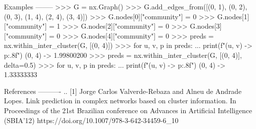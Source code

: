 \begin{DoxyVerb}
Examples
--------
>>> G = nx.Graph()
>>> G.add_edges_from([(0, 1), (0, 2), (0, 3), (1, 4), (2, 4), (3, 4)])
>>> G.nodes[0]["community"] = 0
>>> G.nodes[1]["community"] = 1
>>> G.nodes[2]["community"] = 0
>>> G.nodes[3]["community"] = 0
>>> G.nodes[4]["community"] = 0
>>> preds = nx.within_inter_cluster(G, [(0, 4)])
>>> for u, v, p in preds:
...     print(f"({u}, {v}) -> {p:.8f}")
(0, 4) -> 1.99800200
>>> preds = nx.within_inter_cluster(G, [(0, 4)], delta=0.5)
>>> for u, v, p in preds:
...     print(f"({u}, {v}) -> {p:.8f}")
(0, 4) -> 1.33333333

References
----------
.. [1] Jorge Carlos Valverde-Rebaza and Alneu de Andrade Lopes.
   Link prediction in complex networks based on cluster information.
   In Proceedings of the 21st Brazilian conference on Advances in
   Artificial Intelligence (SBIA'12)
   https://doi.org/10.1007/978-3-642-34459-6_10
\end{DoxyVerb}
 